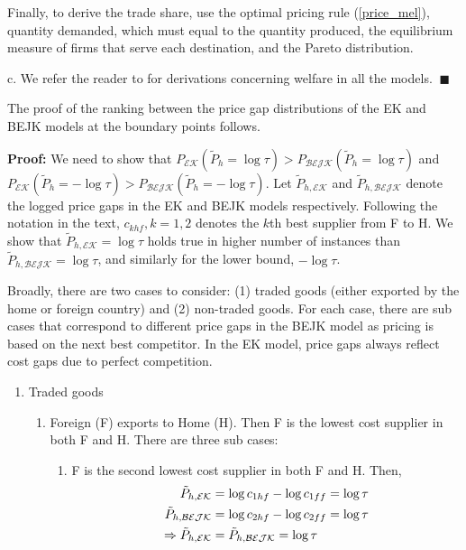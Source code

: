 \documentclass[12pt,dvips, ps2pdf]{article}
\begin{document}
\begin{appendix}
Finally, to derive the trade share, use the optimal pricing rule (\ref{price_mel}), quantity demanded, which must equal to the quantity produced, the equilibrium measure of firms that serve each destination, and the Pareto distribution.

c. We refer the reader to \citet{acr09} for derivations concerning welfare in all the models. $\ \blacksquare$

The proof of the ranking between the price gap distributions of the EK and BEJK models at the boundary points follows.

\textbf{Proof:} We need to show that $P_{\mathcal{EK}}(\tilde P_h =\log\tau) > P_{\mathcal{BEJK}}(\tilde P_h =\log\tau)$ and $P_{\mathcal{EK}}(\tilde P_h =-\log\tau) > P_{\mathcal{BEJK}}(\tilde P_h =-\log\tau)$. Let $\tilde P_{h, \mathcal{EK}}$ and $\tilde P_{h, \mathcal{BEJK}}$ denote the logged price gaps in the EK and BEJK models respectively. Following the notation in the text, $c_{khf}, k=1,2$ denotes the $k$th best supplier from F to H. We show that $\tilde P_{h, \mathcal{EK}}=\log\tau$ holds true in higher number of instances than $\tilde P_{h, \mathcal{BEJK}}=\log\tau$, and similarly for the lower bound, $-\log\tau$.

Broadly, there are two cases to consider: (1) traded goods (either exported by the home or foreign country) and (2) non-traded goods. For each case, there are sub cases that correspond to different price gaps in the BEJK model as pricing is based on the next best competitor. In the EK model, price gaps always reflect cost gaps due to perfect competition.
\begin{enumerate}

\item Traded goods

\begin{enumerate}

\item Foreign (F) exports to Home (H). Then F is the lowest cost supplier in both F and H. There are three sub cases:

\begin{enumerate}
\item F is the second lowest cost supplier in both F and H. Then,
\begin{align}
\tilde P_{h, \mathcal{EK}}&=\log c_{1hf}-\log c_{1ff}=\log\tau\notag\\
\tilde P_{h, \mathcal{BEJK}}&=\log c_{2hf}-\log c_{2ff}=\log\tau\notag\\
\Rightarrow \tilde P_{h, \mathcal{EK}}&=\tilde P_{h, \mathcal{BEJK}}=\log\tau\notag
\end{align}


\end{enumerate}
\end{enumerate}
\end{enumerate}
\end{appendix}
\end{document}
